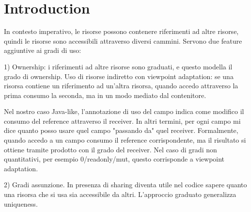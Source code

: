
\section{Introduction}\label{sect:intro}
In contesto imperativo, le risorse possono contenere riferimenti ad altre risorse, quindi le risorse sono accessibili attraverso diversi cammini. Servono due feature aggiuntive ai gradi di uso:

1) Ownership: i riferimenti ad altre risorse sono graduati, e questo modella il grado di ownership. Uso di risorse indiretto con viewpoint adaptation: se una risorsa contiene un riferimento ad un'altra risorsa, quando accedo attraverso la prima consumo la seconda, ma in un modo mediato dal contenitore. 

Nel nostro caso Java-like, l'annotazione di uso del campo indica come modifico il consumo del reference attraverso il receiver. In altri termini, per ogni campo mi dice quanto posso usare quel campo "passando da" quel receiver. Formalmente, quando accedo a un campo consumo il reference corrispondente, ma il risultato si ottiene tramite prodotto con il grado del receiver.  Nel caso di gradi non quantitativi, per esempio 0/readonly/mut, questo corrisponde a viewpoint adaptation. 

2) Gradi assunzione. In presenza di sharing diventa utile nel codice sapere quanto una risorsa che si usa sia accessibile da altri. L'approccio graduato generalizza uniqueness.



